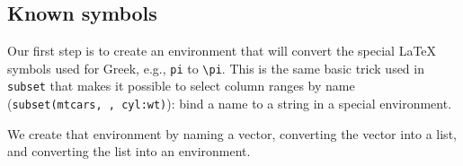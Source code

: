 \hypertarget{known-symbols}{%
\subsection{Known symbols}\label{known-symbols}}

Our first step is to create an environment that will convert the special
LaTeX symbols used for Greek, e.g., \texttt{pi} to
\texttt{\textbackslash{}pi}. This is the same basic trick used in
\texttt{subset} that makes it possible to select column ranges by name
(\texttt{subset(mtcars,\ ,\ cyl:wt)}): bind a name to a string in a
special environment.

We create that environment by naming a vector, converting the vector
into a list, and converting the list into an environment.

\begin{Shaded}
\begin{Highlighting}[]
\StringTok{ }\NormalTok{(}
  \NormalTok{, }\NormalTok{, }\NormalTok{, }\NormalTok{, }\NormalTok{, }\NormalTok{, }\NormalTok{,}
  \NormalTok{, }\NormalTok{, }\NormalTok{, }\NormalTok{, }\NormalTok{, }\NormalTok{, }\NormalTok{,}
  \NormalTok{, }\NormalTok{, }\NormalTok{, }\NormalTok{, }\NormalTok{, }\NormalTok{,}
  \NormalTok{, }\NormalTok{, }\NormalTok{, }\NormalTok{, }\NormalTok{, }\NormalTok{, }\NormalTok{, }\NormalTok{,}
  \NormalTok{, }\NormalTok{, }\NormalTok{, }\NormalTok{, }\NormalTok{, }\NormalTok{, }\NormalTok{, }
  \NormalTok{, }\NormalTok{, }\NormalTok{, }\NormalTok{, }\NormalTok{)}
\StringTok{ }\NormalTok{(}\NormalTok{(}\CharTok{\textbackslash{}\textbackslash{}}
\StringTok{ }\NormalTok{(} \NormalTok{())}
\end{Highlighting}
\end{Shaded}

